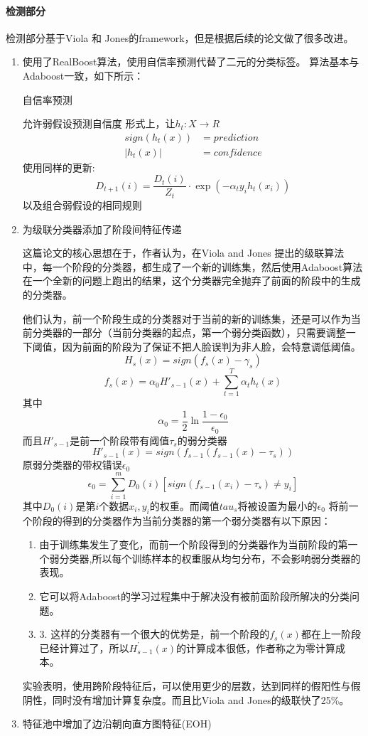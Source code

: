 \paragraph{检测部分}
检测部分基于Viola 和 Jones的framework，但是根据后续的论文做了很多改进。
\begin{enumerate}
\item
使用了RealBoost算法，使用自信率预测代替了二元的分类标签。
算法基本与Adaboost一致，如下所示：
\begin{algorithm}
\caption{自信率预测}
    \begin{algorithmic}[1]
    \State 允许弱假设预测自信度
    \State 形式上，让$h_t:X\rightarrow R$    
    $$
    \begin{aligned}
        sign(h_t(x))&=prediction\\
        |h_t(x)|&=confidence
    \end{aligned}
    $$
    \State 使用同样的更新:
    $$D_{t+1}(i)=\frac{D_t(i)}{Z_t}\cdot \exp(-\alpha_ty_ih_t(x_i))$$
    以及组合弱假设的相同规则
    \end{algorithmic}
\end{algorithm}
\item
为级联分类器添加了阶段间特征传递\cite{inter_feature_propgation}

这篇论文的核心思想在于，作者认为，在Viola and Jones 提出的级联算法中，每一个阶段的分类器，都生成了一个新的训练集，然后使用Adaboost算法在一个全新的问题上跑出的结果，这个分类器完全抛弃了前面的阶段中的生成的分类器。

他们认为，前一个阶段生成的分类器对于当前的新的训练集，还是可以作为当前分类器的一部分（当前分类器的起点，第一个弱分类函数），只需要调整一下阈值，因为前面的阶段为了保证不把人脸误判为非人脸，会特意调低阈值。
$$H_s(x)=sign(f_s(x)-\gamma_s)$$
$$f_s(x)=\alpha_0H'_{s-1}(x)+\sum_{t=1}^T\alpha_th_t(x)$$
其中
$$\alpha_0=\frac{1}{2}\ln{\frac{1-\epsilon_0}{\epsilon_0}}$$
而且$H'_{s-1}$是前一个阶段带有阈值$\tau_s$的弱分类器
$$H'_{s-1}(x)=sign(f_{s-1}(f_{s-1}(x)-\tau_s))$$
原弱分类器的带权错误$\epsilon_0$
$$\epsilon_0=\sum_{i=1}^mD_0(i)[sign(f_{s-1}(x_i)-\tau_s)\neq y_i]$$
其中$D_0(i)$是第$i$个数据$x_i,y_i$的权重。而阈值$tau_s$将被设置为最小的$\epsilon_0$
将前一个阶段的得到的分类器作为当前分类器的第一个弱分类器有以下原因：
\begin{enumerate}
\item
由于训练集发生了变化，而前一个阶段得到的分类器作为当前阶段的第一个弱分类器,所以每个训练样本的权重服从均匀分布，不会影响弱分类器的表现。
\item
它可以将Adaboost的学习过程集中于解决没有被前面阶段所解决的分类问题。
\item
3.	这样的分类器有一个很大的优势是，前一个阶段的$f_s(x)$都在上一阶段已经计算过了，所以$H^’_{s-1}(x)$的计算成本很低，作者称之为零计算成本。
\end{enumerate}
实验表明，使用跨阶段特征后，可以使用更少的层数，达到同样的假阳性与假阴性，同时没有增加计算复杂度。而且比Viola and Jones的级联快了25\%。
\item
特征池中增加了边沿朝向直方图特征(EOH)\cite{learning_object_dection}


\end{enumerate}
